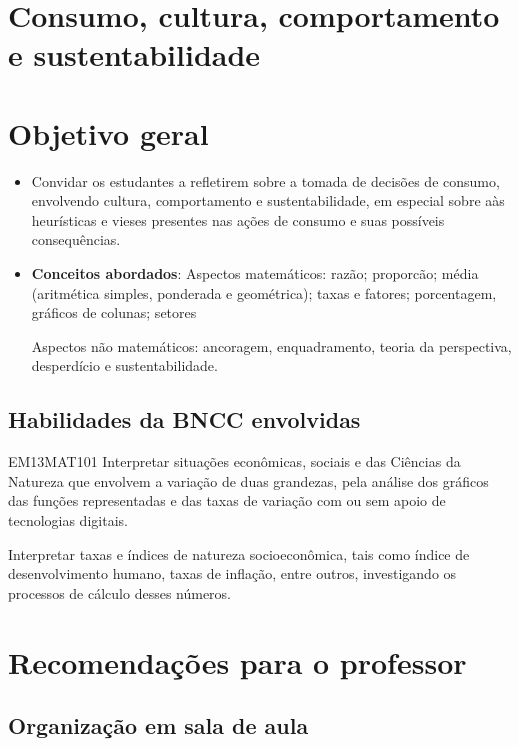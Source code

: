 \begin{paginatexto}
\section*{Consumo, cultura, comportamento e sustentabilidade}
\section*{Objetivo geral}

\begin{itemize}
\item Convidar os estudantes a refletirem sobre a tomada de decisões de consumo, envolvendo cultura, comportamento e sustentabilidade, em especial sobre aàs heurísticas e vieses presentes nas ações de consumo e suas possíveis consequências.

\item \textbf{Conceitos abordados}: 
Aspectos matemáticos: razão; proporcão; média (aritmética simples, ponderada e geométrica); taxas e fatores; porcentagem, gráficos de colunas; setores

Aspectos não matemáticos: ancoragem, enquadramento, teoria da perspectiva, desperdício e sustentabilidade.
\end{itemize}

\subsection{Habilidades da BNCC envolvidas}

\begin{habilities}{EM13MAT101}
 Interpretar situações econômicas, sociais e das Ciências da Natureza
que envolvem a variação de duas grandezas, pela análise dos gráficos das funções representadas e das taxas de variação com ou sem apoio de tecnologias digitais.


Interpretar taxas e índices de natureza socioeconômica, tais como índice de desenvolvimento humano, taxas de inflação, entre outros, investigando os processos de cálculo desses números.
\end{habilities}

\section*{Recomendações para o professor}
\vspace{-1em}
\subsection{Organização em sala de aula}


\end{paginatexto}
